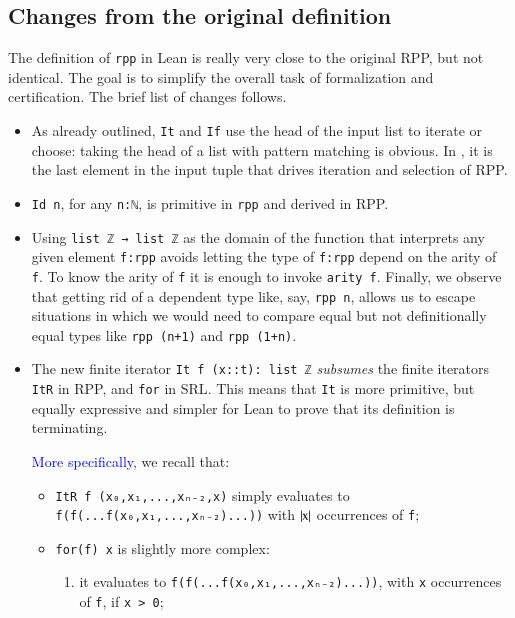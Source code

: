 \documentclass[preprint]{elsarticle}
\theoremstyle{remark}
\newcommand{\RPP}{\textsf{RPP}\xspace}
\newcommand{\LEAN}{\textsf{Lean}\xspace}
\newcommand{\SRL}{\textsf{SRL}\xspace}
\begin{document}
\subsection{Changes from the original definition}
The definition of \lstinline|rpp| in \LEAN is really very close to the original \RPP, but not identical. The goal is to simplify the overall task of formalization and certification. The brief list of changes follows.
\begin{itemize}
    \item As already outlined, \lstinline|It| and \lstinline|If| use the head of the input list to iterate or choose: taking the head of a list with pattern matching is obvious. In \cite{DBLP:journals/tcs/PaoliniPR20}, it is the last element in the input tuple that drives iteration and selection of \RPP.

    \item \lstinline|Id n|, for any \lstinline|n:ℕ|, is primitive in \lstinline|rpp| and derived in \RPP.

    \item Using \lstinline|list ℤ → list ℤ| as the domain of the function that interprets any given element \lstinline|f:rpp| avoids  letting the type of \lstinline|f:rpp| depend on the arity of \lstinline|f|. To know the arity of \lstinline|f| it is enough to invoke \lstinline|arity f|. Finally, we observe that getting rid of a dependent type like, say, \lstinline|rpp n|, allows us to escape situations in which we would need to compare equal but not definitionally equal types like \lstinline|rpp (n+1)| and \lstinline|rpp (1+n)|.

    \item The new finite iterator \lstinline|It f (x::t): list ℤ| \emph{subsumes} the finite iterators \lstinline|ItR| in \RPP, and \lstinline|for| in \SRL. This means that \lstinline|It| is more primitive, but equally expressive and simpler for \LEAN to prove that its definition is terminating.

    \textcolor{blue}{More specifically, } we recall that:
    \begin{itemize}
        \item \lstinline|ItR f (x₀,x₁,...,xₙ₋₂,x)| simply evaluates to \lstinline|f(f(...f(x₀,x₁,...,xₙ₋₂)...))| with $ \mid\!\!\mbox{\lstinline|x|}\!\!\mid $ occurrences of \lstinline|f|;

        \item \lstinline|for(f) x| is slightly more complex:
        \begin{enumerate}
            \item it evaluates to \lstinline|f(f(...f(x₀,x₁,...,xₙ₋₂)...))|, with \lstinline|x| occurrences of \lstinline|f|, if \lstinline|x > 0|;


\end{enumerate}
\end{itemize}
\end{itemize}
\end{document}
